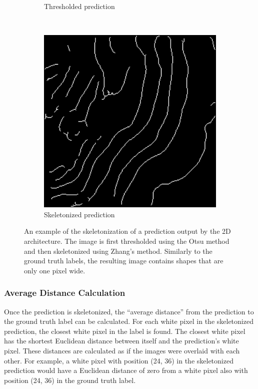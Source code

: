 \begin{figure}[t]
\begin{subfigure}[t]{0.32\textwidth}
        \caption{Thresholded prediction}
    \end{subfigure}
    ~
    \begin{subfigure}[t]{0.32\textwidth}
        \centering
        \includegraphics[width=1\textwidth, valign=c]{images/skel-skel.png}
        \caption{Skeletonized prediction}
    \end{subfigure}
    \caption{An example of the skeletonization of a prediction output by the 2D architecture. The image is first thresholded using the Otsu method and then skeletonized using Zhang's method. Similarly to the ground truth labels, the resulting image contains shapes that are only one pixel wide.}
    \label{fig:skeletonisation}
\end{figure}

\subsubsection{Average Distance Calculation}

Once the prediction is skeletonized, the ``average distance'' from the prediction to the ground truth label can be calculated. For each white pixel in the skeletonized prediction, the closest white pixel in the label is found. The closest white pixel has the shortest Euclidean distance between itself and the prediction's white pixel. These distances are calculated as if the images were overlaid with each other. For example, a white pixel with position (24, 36) in the skeletonized prediction would have a Euclidean distance of zero from a white pixel also with position (24, 36) in the ground truth label.

